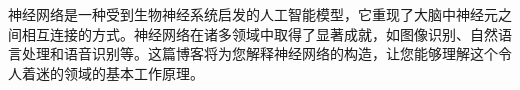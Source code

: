 神经网络是一种受到生物神经系统启发的人工智能模型，它重现了大脑中神经元之间相互连接的方式。神经网络在诸多领域中取得了显著成就，如图像识别、自然语言处理和语音识别等。这篇博客将为您解释神经网络的构造，让您能够理解这个令人着迷的领域的基本工作原理。